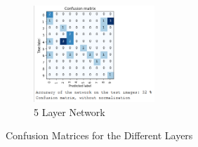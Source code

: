 \documentclass{report}
\begin{document}
\begin{figure}[h!]
\begin{subfigure}[t]{0.45\textwidth}
            \centering
            \includegraphics[width=0.5\textwidth]{5_layers}
            \caption{5 Layer Network}
        \end{subfigure}
        \caption{Confusion Matrices for the Different Layers}
    \end{figure}
\end{document}
